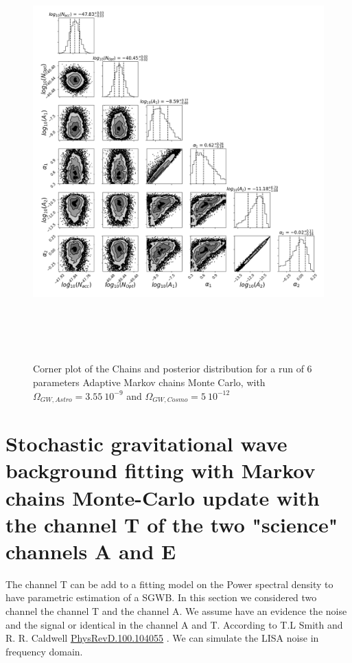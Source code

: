 \documentclass[a4paper,12pt]{article}
\begin{document}
\begin{figure}[H]
    \centering
    \includegraphics[height= 16cm]{covarince/McMC6param/corners2.png}
    \caption{Corner plot of the Chains and posterior distribution for a run of 6 parameters Adaptive Markov chains Monte Carlo, with $\Omega_{GW,Astro} = 3.55 \ 10^{-9}$ and  $\Omega_{GW,Cosmo} = 5 \ 10^{-12}$}
    \label{fig:Corner6param2}
\end{figure}

\section{Stochastic gravitational wave background fitting with Markov chains Monte-Carlo update with the channel T of the two "science" channels A and E}

The channel T can be add to a fitting model on the Power spectral density to have parametric estimation of a SGWB. In this section we considered two channel the channel T and the channel A. We assume have an evidence the noise and the signal or identical in the channel A and T. According to T.L Smith and R. R. Caldwell \href{https://arxiv.org/pdf/1908.00546.pdf}{PhysRevD.100.104055} \cite{PhysRevD.100.104055}. We can simulate the LISA noise in frequency domain.
\end{document}
